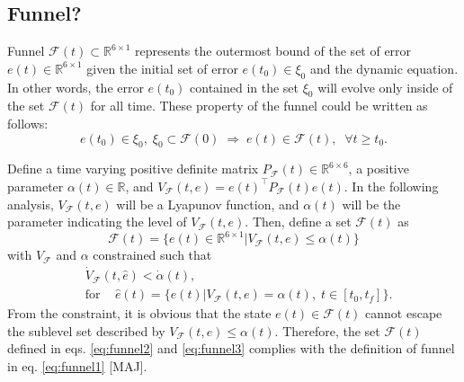\documentclass[letterpaper, 10 pt, conference]{ieeeconf}  %
\begin{document}
\subsection{Funnel?}
Funnel $\mathcal{F}(t) \subset \mathbb{R}^{6\times 1}$  represents the outermost bound of the set of error $e(t)\in \mathbb{R}^{6\times 1}$ given the initial set of error $e(t_0) \in \xi_0$ and the dynamic equation.
In other words, the error $e(t_0)$ contained in the set $\xi_0$ will evolve only inside of the set $\mathcal{F}(t)$ for all time.
These property of the funnel could be written as follows:
\begin{equation}
e(t_0) \in \xi_0,\;\xi_0 \subset \mathcal{F}(0)\;\Rightarrow\; e(t) \in \mathcal{F}(t),\;\;\forall t \geq t_0. \label{eq:funnel1}
\end{equation}

Define a time varying positive definite matrix $P_\mathcal{F}(t) \in \mathbb{R}^{6\times 6}$, a positive parameter $\alpha(t) \in \mathbb{R}$, and $V_\mathcal{F}(t,e) = e(t)^\top P_\mathcal{F}(t) e(t)$.
In the following analysis, $V_\mathcal{F}(t,e)$ will be a Lyapunov function, and $\alpha(t)$ will be the parameter indicating the level of $V_\mathcal{F}(t,e)$.
Then, define a set $\mathcal{F}(t)$ as 
\begin{equation}
\mathcal{F}(t) = \{e(t) \in \mathbb{R}^{6\times 1} | V_\mathcal{F}(t,e) \leq \alpha(t)\} \label{eq:funnel2}
\end{equation}
with $V_\mathcal{F}$ and $\alpha$ constrained such that
\begin{align}
&\dot{V}_\mathcal{F}(t,\hat{e}) < \dot{\alpha}(t), \label{eq:funnel3} \\
&\text{for }\;\;\;\hat{e}(t) = \{e(t)|V_\mathcal{F}(t,e) = \alpha(t),\;t\in[t_0,t_f]\}. \nonumber
\end{align}
From the constraint, it is obvious that the state $e(t) \in \mathcal{F}(t)$ cannot escape the sublevel set described by $V_\mathcal{F}(t,e) \leq \alpha(t)$.
Therefore, the set $\mathcal{F}(t)$ defined in eqs. \eqref{eq:funnel2} and \eqref{eq:funnel3}
 complies with the definition of funnel in eq. \eqref{eq:funnel1} [MAJ]. 
\end{document}

